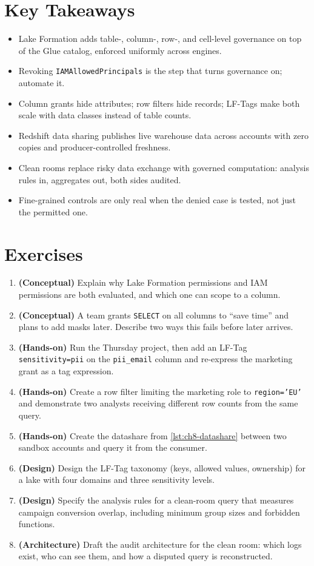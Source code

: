 \section*{Key Takeaways}
\begin{itemize}
    \item Lake Formation adds table-, column-, row-, and cell-level governance on top of the Glue catalog, enforced uniformly across engines.
    \item Revoking \texttt{IAMAllowedPrincipals} is the step that turns governance on; automate it.
    \item Column grants hide attributes; row filters hide records; LF-Tags make both scale with data classes instead of table counts.
    \item Redshift data sharing publishes live warehouse data across accounts with zero copies and producer-controlled freshness.
    \item Clean rooms replace risky data exchange with governed computation: analysis rules in, aggregates out, both sides audited.
    \item Fine-grained controls are only real when the denied case is tested, not just the permitted one.
\end{itemize}

\section{Exercises}
\begin{enumerate}
    \item \textbf{(Conceptual)} Explain why Lake Formation permissions and IAM permissions are both evaluated, and which one can scope to a column.
    \item \textbf{(Conceptual)} A team grants \texttt{SELECT} on all columns to ``save time'' and plans to add masks later. Describe two ways this fails before later arrives.
    \item \textbf{(Hands-on)} Run the Thursday project, then add an LF-Tag \texttt{sensitivity=pii} on the \texttt{pii\_email} column and re-express the marketing grant as a tag expression.
    \item \textbf{(Hands-on)} Create a row filter limiting the marketing role to \texttt{region='EU'} and demonstrate two analysts receiving different row counts from the same query.
    \item \textbf{(Hands-on)} Create the datashare from \cref{lst:ch8-datashare} between two sandbox accounts and query it from the consumer.
    \item \textbf{(Design)} Design the LF-Tag taxonomy (keys, allowed values, ownership) for a lake with four domains and three sensitivity levels.
    \item \textbf{(Design)} Specify the analysis rules for a clean-room query that measures campaign conversion overlap, including minimum group sizes and forbidden functions.
    \item \textbf{(Architecture)} Draft the audit architecture for the clean room: which logs exist, who can see them, and how a disputed query is reconstructed.
\end{enumerate}

